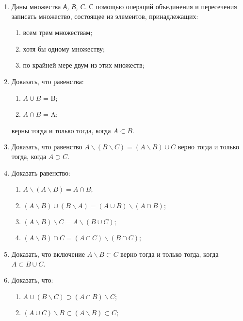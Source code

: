 \documentclass{article}
\begin{document}
    \begin{enumerate}
        \item  Даны множества \textit{А, В, С}. С помощью операций объединения и пересечения записать множество, состоящее из элементов, принадлежащих:
        \begin{enumerate}
            \item всем трем множествам;
            \item хотя бы одному множеству;
            \item по крайней мере двум из этих множеств;
        \end{enumerate}

        \item Доказать, что равенства:
        \begin{enumerate}
            \item $A \cup B$ = B;
            \item $A \cap B$ = A;
        \end{enumerate}
        верны тогда и только тогда, когда $A \subset B$.

        \item Доказать, что равенство $A\backslash (B \backslash C) = (A \backslash B) \cup C$ верно тогда и только тогда, когда $A \supset C$.

        \item Доказать равенство:
        \begin{enumerate}
            \item $A \backslash (A \backslash B) = A \cap B$;
            \item $(A \backslash B) \cup (B \backslash A) = (A \cup B) \backslash (A \cap B)$;
            \item $(A \backslash B) \backslash C = A \backslash (B \cup C);$
            \item $(A \backslash B) \cap C = (A \cap C) \backslash (B \cap C)$;
        \end{enumerate}

        \item Доказать, что включение $A \backslash B \subset C$ верно тогда и только тогда, когда $A \subset B \cup C$.

        \item Доказать, что:
        \begin{enumerate}
            \item $A \cup (B \backslash C) \supset (A \cap B) \backslash C$;
            \item $(A \cup C) \backslash B \subset (A \backslash B) \subset C$;
        \end{enumerate}


\end{enumerate}
\end{document}
